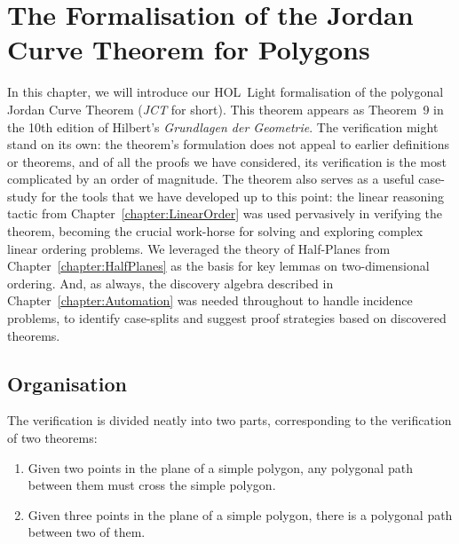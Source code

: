 \chapter{The Formalisation of the Jordan Curve Theorem for Polygons}\label{chapter:JordanFormalisation}

In this chapter, we will introduce our HOL~Light formalisation of the polygonal Jordan Curve Theorem (\emph{JCT} for short). This theorem appears as Theorem~9 in the 10th edition of Hilbert's \emph{Grundlagen der Geometrie}. The verification might stand on its own: the theorem's formulation does not appeal to earlier definitions or theorems, and of all the proofs we have considered, its verification is the most complicated by an order of magnitude. The theorem also serves as a useful case-study for the tools that we have developed up to this point: the linear reasoning tactic from Chapter~\ref{chapter:LinearOrder} was used pervasively in verifying the theorem, becoming the crucial work-horse for solving and exploring complex linear ordering problems. We leveraged the theory of Half-Planes from Chapter~\ref{chapter:HalfPlanes} as the basis for key lemmas on two-dimensional ordering. And, as always, the discovery algebra described in Chapter~\ref{chapter:Automation} was needed throughout to handle incidence problems, to identify case-splits and suggest proof strategies based on discovered theorems. 

\section{Organisation}
The verification is divided neatly into two parts, corresponding to the verification of two theorems:
\begin{enumerate}
  \item Given two points in the plane of a simple polygon, any polygonal path between them must cross the simple polygon.
  \item Given three points in the plane of a simple polygon, there is a polygonal path between two of them.
\end{enumerate}

